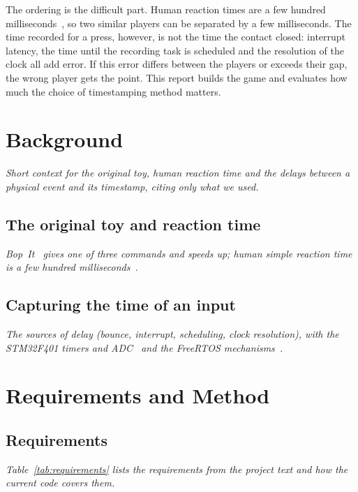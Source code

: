 \documentclass[11pt, a4paper]{article}
\newcommand{\plan}[1]{\begingroup\color{blue!55!black}\itshape #1\par\endgroup}
\begin{document}
The ordering is the difficult part. Human reaction times are a few hundred milliseconds~\cite{woods2015}, so two similar players can be separated by a few milliseconds. The time recorded for a press, however, is not the time the contact closed: interrupt latency, the time until the recording task is scheduled and the resolution of the clock all add error. If this error differs between the players or exceeds their gap, the wrong player gets the point. This report builds the game and evaluates how much the choice of timestamping method matters.

\section{Background}
\label{sec:background}

\plan{Short context for the original toy, human reaction time and the delays between a physical event and its timestamp, citing only what we used.}

\subsection{The original toy and reaction time}
\plan{Bop~It~\cite{bopit} gives one of three commands and speeds up; human simple reaction time is a few hundred milliseconds~\cite{woods2015}.}

\subsection{Capturing the time of an input}
\plan{The sources of delay (bounce, interrupt, scheduling, clock resolution), with the STM32F401 timers and ADC~\cite{rm0368} and the FreeRTOS mechanisms~\cite{barry2016}.}

\section{Requirements and Method}
\label{sec:method}

\subsection{Requirements}
\label{sec:requirements}

\plan{Table~\ref{tab:requirements} lists the requirements from the project text and how the current code covers them.}
\end{document}
